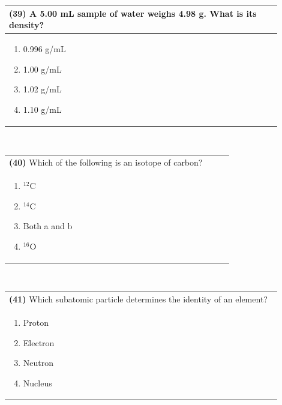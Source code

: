 \documentclass{article}
\begin{document}
\vspace{0.5cm}
\noindent \begin{tabular}{|p{0.9\linewidth}|}
\hline
\vspace{0.2cm}
\textbf{(39)} A 5.00 mL sample of water weighs 4.98 g. What is its density?\\
\hline
\vspace{0.2cm}
\begin{minipage}[t]{0.85\linewidth}
\begin{enumerate}[label=\alph*.]
\item 0.996 g/mL
\item 1.00 g/mL
\item 1.02 g/mL
\item 1.10 g/mL
\end{enumerate}
\end{minipage}\\
\hline
\end{tabular}
\\



\noindent \begin{tabular}{|p{0.9\linewidth}|}
\hline
\vspace{0.2cm}
\textbf{(40)} Which of the following is an isotope of carbon? \\
\begin{minipage}[t]{0.85\linewidth}
\begin{enumerate}[label=\alph*.]
\item $^{12}$C
\item $^{14}$C
\item Both a and b
\item $^{16}$O
\end{enumerate}
\end{minipage}\\
\hline
\end{tabular}
\\
\newpage
\noindent \begin{tabular}{|p{0.9\linewidth}|}
\hline
\vspace{0.2cm}
\textbf{(41)} Which subatomic particle determines the identity of an element? \\
\begin{minipage}[t]{0.85\linewidth}
\begin{enumerate}[label=\alph*.]
\item Proton
\item Electron
\item Neutron
\item Nucleus
\end{enumerate}
\end{minipage}\\
\hline
\end{tabular}
\\
\end{document}
